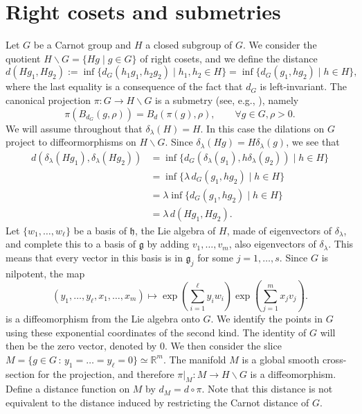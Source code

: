 \documentclass[12pt]{amsart}
\begin{document}
\section{Right cosets and submetries}\label{projectedmanifolds}

Let $G$ be a Carnot group and $H$ a closed subgroup of $G$. We consider the quotient  $H\backslash G = \{Hg\mid g\in G\}$ of right cosets, and we define the distance
$$
d(Hg_1,Hg_2):= \inf \{d_G(h_1g_1,h_2g_2)\mid h_1,h_2\in H\}= \inf \{d_G(g_1,hg_2)\mid h\in H\},
$$
where the last equality is a consequence of the fact that $d_G$ is left-invariant.
The canonical projection $\pi: G\to H\backslash G$ is a submetry (see, e.g., \cite{LeDonneBook}), namely 
$$
\pi ( B_{d_G}(g,\rho)) =  B_d(\pi(g),\rho),\qquad \forall g\in G, \rho>0.
$$
We will assume throughout that $\delta_\lambda(H) = H$.  
 In this case the dilations on $G$ project to diffeormorphisms on $H\backslash G$. Since $\delta_\lambda(Hg) = H\delta_\lambda(g)$, we see that
\begin{align*}
d(\delta_\lambda(Hg_1),\delta_\lambda(Hg_2))&=
\inf \{d_G(\delta_\lambda(g_1),h\delta_\lambda(g_2))\mid h\in H\}\\
&=
\inf \{\lambda\,  d_G(g_1,hg_2)\mid h\in H\}\\
&=
\lambda\inf \{ d_G(g_1,hg_2)\mid h\in H\}\\
&= \lambda \, d(Hg_1,Hg_2).
\end{align*}
Let $\{w_1,\dots,w_\ell\}$ be a basis of $\mathfrak h$, the Lie algebra of $H$, made of eigenvectors of $\delta_\lambda$, and complete this to a basis of $\mathfrak g$ by adding $v_1,\dots,v_m$, also eigenvectors of $\delta_\lambda$. This means that every vector in this basis is in $\mathfrak g_j$ for some $j=1,\dots,s$.
Since $G$ is nilpotent, the map
\begin{equation}   \label{expcoords}
(y_1,\dots,y_\ell,x_1,\dots,x_m) \mapsto \exp \left(\sum_{i=1}^\ell y_iw_i\right) \exp \left(\sum_{j=1}^m x_jv_j\right).
\end{equation}
is a diffeomorphism from the Lie algebra onto $G$. 
We  identify the points in $G$ using these exponential coordinates of the second kind. The identity of $G$ will then be the zero vector, denoted by $0$.
We then consider the slice $ M=\{g\in G\,:\, y_1=\dots=y_\ell=0\}\simeq \mathbb R^m$.
The manifold $M$ is a global smooth cross-section for the projection, and therefore $\pi\big|_{ M}:  M\to H\backslash G$ is a diffeomorphism. 
Define a distance function on $M$ by $d_M = d\circ \pi$. 
Note that this distance is not equivalent to the distance induced by restricting the Carnot distance of $G$.
\end{document}

